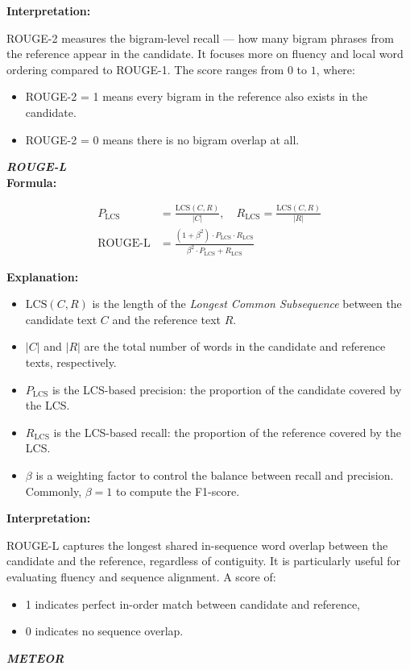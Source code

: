 \documentclass[conference]{IEEEtran}
\begin{document}
\textbf{Interpretation:}

ROUGE-2 measures the bigram-level recall — how many bigram phrases from the reference appear in the candidate. It focuses more on fluency and local word ordering compared to ROUGE-1. The score ranges from $0$ to $1$, where:
\begin{itemize}
  \item ROUGE-2 = 1 means every bigram in the reference also exists in the candidate.
  \item ROUGE-2 = 0 means there is no bigram overlap at all.
\end{itemize}
\vspace{1em}
\noindent \textbf{\textit{ROUGE-L}}\\

\textbf{Formula:}

\begin{align}
P_{\text{LCS}} &= \frac{\text{LCS}(C, R)}{|C|}, \quad
R_{\text{LCS}} = \frac{\text{LCS}(C, R)}{|R|} \\
\text{ROUGE-L} &= \frac{(1 + \beta^2) \cdot P_{\text{LCS}} \cdot R_{\text{LCS}}}{\beta^2 \cdot P_{\text{LCS}} + R_{\text{LCS}}}
\end{align}

\textbf{Explanation:}
\begin{itemize}
  \item $\text{LCS}(C, R)$ is the length of the \textit{Longest Common Subsequence} between the candidate text $C$ and the reference text $R$.
  \item $|C|$ and $|R|$ are the total number of words in the candidate and reference texts, respectively.
  \item $P_{\text{LCS}}$ is the LCS-based precision: the proportion of the candidate covered by the LCS.
  \item $R_{\text{LCS}}$ is the LCS-based recall: the proportion of the reference covered by the LCS.
  \item $\beta$ is a weighting factor to control the balance between recall and precision. Commonly, $\beta = 1$ to compute the F1-score.
\end{itemize}

\textbf{Interpretation:}

ROUGE-L captures the longest shared in-sequence word overlap between the candidate and the reference, regardless of contiguity. It is particularly useful for evaluating fluency and sequence alignment. A score of:
\begin{itemize}
  \item 1 indicates perfect in-order match between candidate and reference,
  \item 0 indicates no sequence overlap.
\end{itemize}
\vspace{1em}
\noindent \textbf{\textit{METEOR}}\\
\end{document}
